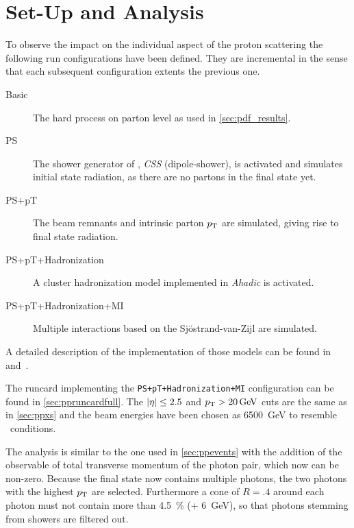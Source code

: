 \section{Set-Up and Analysis}%
\label{sec:setupan}

To observe the impact on the individual aspect of the proton
scattering the following run configurations have been defined. They
are incremental in the sense that each subsequent configuration
extents the previous one.

\begin{description}
\item[Basic] The hard process on parton level as used in \cref{sec:pdf_results}.
\item[PS] The shower generator of \sherpa, \emph{CSS} (dipole-shower),
  is activated and simulates initial state radiation, as there are no
  partons in the final state yet.
\item[PS+pT] The beam remnants and intrinsic parton
  \(p_\mathrm{T}\) are simulated, giving rise to final state radiation.
\item[PS+pT+Hadronization] A cluster hadronization model
  implemented in \emph{Ahadic} is activated.
\item[PS+pT+Hadronization+MI] Multiple interactions based on the
  Sj\"ostrand-van-Zijl are simulated.
\end{description}

A detailed description of the implementation of those models can be
found in~\cite{Gleisberg:2008ta} and~\cite{Bothmann:2019yzt}.

The runcard implementing the \texttt{PS+pT+Hadronization+MI}
configuration can be found in \cref{sec:ppruncardfull}. The
\(\abs{\eta}\leq 2.5\) and \(p_\mathrm{T} > \SI{20}{\giga\electronvolt}\) cuts are
the same as in \cref{sec:ppxs} and the beam energies have been chosen
as \SI{6500}{\giga\electronvolt} to resemble \lhc\ conditions.

The analysis is similar to the one used in \cref{sec:ppevents} with
the addition of the observable of total transverse momentum of the
photon pair, which now can be non-zero. Because the final state now
contains multiple photons, the two photons with the highest \(p_\mathrm{T}\)
are selected. Furthermore a cone of \(R=.4\) around each photon must
not contain more than \SI{4.5}{\percent} (+
\SI{6}{\giga\electronvolt}), so that photons stemming from showers are
filtered out. %

